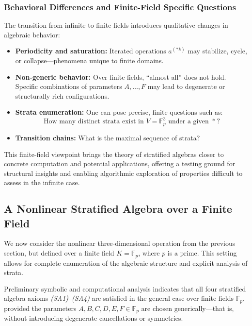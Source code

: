 \documentclass[12pt]{article}
\theoremstyle{definition}
\theoremstyle{plain}
\theoremstyle{remark}
\begin{document}
\subsubsection{Behavioral Differences and Finite-Field Specific Questions}

The transition from infinite to finite fields introduces qualitative changes in algebraic behavior:

\begin{itemize}
    \item \textbf{Periodicity and saturation:} Iterated operations \( a^{(*k)} \) may stabilize, cycle, or collapse—phenomena unique to finite domains.
    \item \textbf{Non-generic behavior:} Over finite fields, ``almost all'' does not hold. Specific combinations of parameters \( A,\dots,F \) may lead to degenerate or structurally rich configurations.
    \item \textbf{Strata enumeration:} One can pose precise, finite questions such as:
    \[
    \text{How many distinct strata exist in } V = \mathbb{F}_p^3 \text{ under a given } *?
    \]
    \item \textbf{Transition chains:} What is the maximal sequence of strata?
\end{itemize}

This finite-field viewpoint brings the theory of stratified algebras closer to concrete computation and potential applications, offering a testing ground for structural insights and enabling algorithmic exploration of properties difficult to assess in the infinite case.

\subsection{A Nonlinear Stratified Algebra over a Finite Field}

We now consider the nonlinear three-dimensional operation from the previous section, but defined over a finite field \( K = \mathbb{F}_p \), where \( p \) is a prime. This setting allows for complete enumeration of the algebraic structure and explicit analysis of strata.

Preliminary symbolic and computational analysis indicates that all four stratified algebra axioms \emph{(SA1)}–\emph{(SA4)} are satisfied in the general case over finite fields \( \mathbb{F}_p \), provided the parameters \( A, B, C, D, E, F \in \mathbb{F}_p \) are chosen generically—that is, without introducing degenerate cancellations or symmetries.
\end{document}
